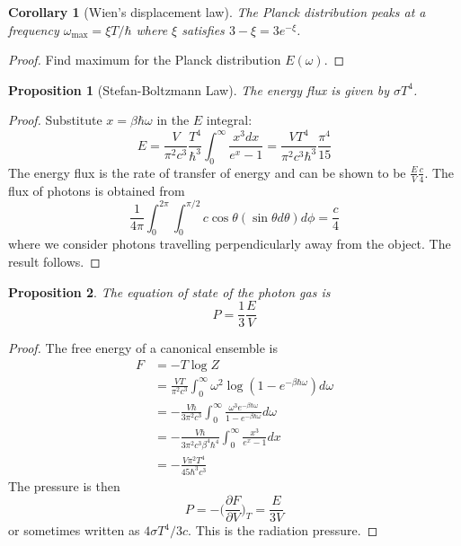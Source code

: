 \documentclass[a4paper]{article}
\theoremstyle{new}
\newtheorem{prop}{Proposition}[section]
\newtheorem{cor}{Corollary}[section]
\begin{document}
\begin{cor}[Wien's displacement law]
The Planck distribution peaks at a frequency $\omega_{\text{max}}=\xi T/\hbar$ where $\xi$ satisfies $3-\xi=3e^{-\xi}$.
\end{cor}
\begin{proof}
Find maximum for the Planck distribution $E(\omega)$.
\end{proof}
\begin{prop}[Stefan-Boltzmann Law]
The energy flux is given by $\sigma T^4$.
\end{prop}
\begin{proof}
Substitute $x=\beta\hbar\omega$ in the $E$ integral:
$$E=\frac{V}{\pi^2c^3}\frac{T^4}{\hbar^3}\int_0^\infty\frac{x^3dx}{e^x-1}=\frac{VT^4}{\pi^2c^3\hbar^3}\frac{\pi^4}{15}$$
The energy flux is the rate of transfer of energy and can be shown to be $\frac{E}{V}\frac{c}{4}$. The flux of photons is obtained from
$$\frac{1}{4\pi}\int_0^{2\pi}\int_0^{\pi/2}c\cos\theta (\sin\theta d\theta) d\phi=\frac{c}{4}$$
where we consider photons travelling perpendicularly away from the object. The result follows.
\end{proof}
\begin{prop}
The equation of state of the photon gas is
$$P=\frac{1}{3}\frac{E}{V}$$
\end{prop}
\begin{proof}
The free energy of a canonical ensemble is
\begin{align}
F&=-T\log Z\nonumber\\&=\frac{VT}{\pi^2c^3}\int_0^\infty\omega^2\log(1-e^{-\beta\hbar\omega})d\omega\nonumber\\&=-\frac{V\hbar}{3\pi^2c^3}\int_0^\infty\frac{\omega^3e^{-\beta\hbar\omega}}{1-e^{-\beta\hbar\omega}}d\omega\nonumber\\&=-\frac{V\hbar}{3\pi^2c^3\beta^4\hbar^4}\int_0^\infty\frac{x^3}{e^x-1}dx\nonumber\\&=-\frac{V\pi^2T^4}{45\hbar^3c^3}\nonumber
\end{align}
The pressure is then
$$P=-\bigg(\frac{\partial F}{\partial V}\bigg)_T=\frac{E}{3V}$$
or sometimes written as $4\sigma T^4/3c$. This is the radiation pressure. 
\end{proof}
\end{document}
